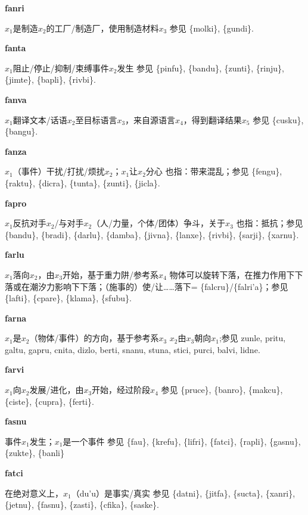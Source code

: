 \documentclass[notitlepage,twocolumn,a4paper,10pt]{book}
\begin{document}
{\sffamily\bfseries fanri} $x_1$是制造$x_2$的工厂\slash{}制造厂，使用制造材料$x_3$ \textemdash{} 参见 \{molki\}, \{gundi\}.

{\sffamily\bfseries fanta} $x_1$阻止\slash{}停止\slash{}抑制\slash{}束缚事件$x_2$发生 \textemdash{} 参见 \{pinfu\}, \{bandu\}, \{zunti\}, \{rinju\}, \{jimte\}, \{bapli\}, \{rivbi\}.

{\sffamily\bfseries fanva} $x_1$翻译文本\slash{}话语$x_2$至目标语言$x_3$，来自源语言$x_4$，得到翻译结果$x_5$ \textemdash{} 参见 \{cusku\}, \{bangu\}.

{\sffamily\bfseries fanza}\enspace {\ttfamily\bfseries[faz]}  $x_1$（事件）干扰\slash{}打扰\slash{}烦扰$x_2$；$x_1$让$x_2$分心 \textemdash{} 也指：带来混乱；参见 \{fengu\}, \{raktu\}, \{dicra\}, \{tunta\}, \{zunti\}, \{jicla\}.

{\sffamily\bfseries fapro}  $x_1$反抗对手$x_2$\slash{}与对手$x_2$（人\slash{}力量，个体\slash{}团体）争斗，关于$x_3$ \textemdash{} 也指：抵抗；参见 \{bandu\}, \{bradi\}, \{darlu\}, \{damba\}, \{jivna\}, \{lanxe\}, \{rivbi\}, \{sarji\}, \{xarnu\}.

{\sffamily\bfseries farlu}\enspace {\ttfamily\bfseries[fal     fa'u]}  $x_1$落向$x_2$，由$x_3$开始，基于重力阱\slash{}参考系$x_4$ \textemdash{} 物体可以旋转下落，在推力作用下下落或在潮汐力影响下下落；（施事的）使\slash{}让……落下= \{falcru\}\slash{}\{falri'a\}；参见 \{lafti\}, \{cpare\}, \{klama\}, \{sfubu\}.

{\sffamily\bfseries farna}\enspace {\ttfamily\bfseries[far     fa'a]}  $x_1$是$x_2$（物体\slash{}事件）的方向，基于参考系$x_3$ \textemdash{} $x_2$由$x_3$朝向$x_1$;参见 {zunle}, {pritu}, {galtu}, {gapru}, {cnita}, {dizlo}, {berti}, {snanu}, {stuna}, {stici}, {purci}, {balvi}, {lidne}.

{\sffamily\bfseries farvi}\enspace {\ttfamily\bfseries[fav]}  $x_1$向$x_2$发展\slash{}进化，由$x_3$开始，经过阶段$x_4$ \textemdash{} 参见 \{pruce\}, \{banro\}, \{makcu\}, \{ciste\}, \{cupra\}, \{ferti\}.

{\sffamily\bfseries fasnu}\enspace {\ttfamily\bfseries[        fau]}  事件$x_1$发生；$x_1$是一个事件 \textemdash{} 参见 \{fau\}, \{krefu\}, \{lifri\}, \{fatci\}, \{rapli\}, \{gasnu\}, \{zukte\}, \{banli\}

{\sffamily\bfseries fatci}\enspace {\ttfamily\bfseries[fac]}  在绝对意义上，$x_1$（du'u）是事实\slash{}真实 \textemdash{} 参见 \{datni\}, \{jitfa\}, \{sucta\}, \{xanri\}, \{jetnu\}, \{fasnu\}, \{zasti\}, \{cfika\}, \{saske\}.
\end{document}
